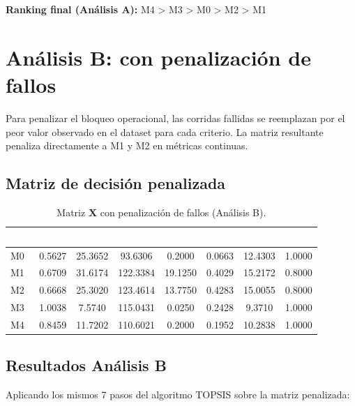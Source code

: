 \documentclass[12pt,a4paper,oneside]{book}
\begin{document}
\textbf{Ranking final (Análisis A):} M4 > M3 > M0 > M2 > M1

\newpage
\section{Análisis B: con penalización de fallos}

Para penalizar el bloqueo operacional, las corridas fallidas se reemplazan por el peor valor observado en el dataset para cada criterio. La matriz resultante penaliza directamente a M1 y M2 en métricas continuas.

\subsection{Matriz de decisión penalizada}

\begin{table}[H]
\centering
\caption{Matriz $\mathbf{X}$ con penalización de fallos (Análisis B).}
\renewcommand{\arraystretch}{1.3}
\small
\begin{tabular}{lccccccc}
\toprule
\rowcolor{primary}
\textcolor{white}{\textbf{Alt.}} &
\textcolor{white}{$d^\star$} &
\textcolor{white}{$T_{pers}$} &
\textcolor{white}{$T_{mis}$} &
\textcolor{white}{$N_{stop}$} &
\textcolor{white}{$\sigma_v$} &
\textcolor{white}{$a_{max}$} &
\textcolor{white}{$\eta_s$} \\
\midrule
M0 & 0.5627 & 25.3652 & 93.6306 & 0.2000 & 0.0663 & 12.4303 & 1.0000 \\
M1 & 0.6709 & 31.6174 & 122.3384 & 19.1250 & 0.4029 & 15.2172 & 0.8000 \\
M2 & 0.6668 & 25.3020 & 123.4614 & 13.7750 & 0.4283 & 15.0055 & 0.8000 \\
M3 & 1.0038 & 7.5740 & 115.0431 & 0.0250 & 0.2428 & 9.3710 & 1.0000 \\
M4 & 0.8459 & 11.7202 & 110.6021 & 0.2000 & 0.1952 & 10.2838 & 1.0000 \\
\bottomrule
\end{tabular}
\end{table}

\subsection{Resultados Análisis B}

Aplicando los mismos 7 pasos del algoritmo TOPSIS sobre la matriz penalizada:
\end{document}
